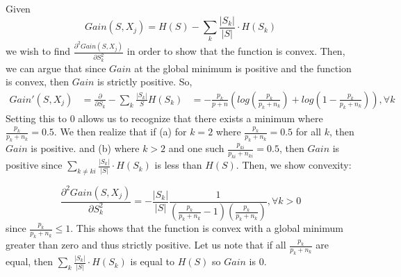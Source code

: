 \documentclass{article}
\begin{document}
Given
\begin{equation*}
Gain(S,X_{j}) = H(S)-\sum_{k}\frac{|S_{k}|}{|S|}\cdot H(S_k)
\end{equation*}
we wish to find \(\frac{\partial^2 Gain(S,X_j)}{\partial S_k^2}\) in order to show that the function is convex. Then, we can argue that since \(Gain\) at the global minimum is positive and the function is convex, then \(Gain\) is strictly positive. So, 
\begin{align*}
Gain'(S,X_j)
&= \frac{\partial}{\partial S_k} -\sum_k \frac{|S_k|}{S} H(S_k)
&= -\frac{p_k}{p+n}(log(\frac{p_k}{p_k+n_k}) + log(1-\frac{p_k}{p_k+n_k})), \forall k
\end{align*}
Setting this to 0 allows us to recognize that there exists a minimum where \(\frac{p_k}{p_k+n_k} = 0.5\). We then realize that if (a) for \(k = 2\) where \(\frac{p_k}{p_k+n_k} = 0.5\) for all \(k\), then \(Gain\) is positive. and (b) where \(k > 2\) and one such \(\frac{p_{ki}}{p_{ki}+n_{ki}} = 0.5\), then \(Gain\) is positive since \(\sum_{k \neq ki}\frac{|S_{k}|}{|S|}\cdot H(S_k)\) is less than \(H(S)\). Then, we show convexity:

\begin{equation*}
\frac{\partial^2 Gain(S,X_j)}{\partial S_k^2} 
= -\frac{|S_k|}{|S|} \frac{1}{(\frac{p_k}{p_k+n_k}-1)(\frac{p_k}{p_k+n_k})}, \forall k
> 0
\end{equation*}
since \(\frac{p_k}{p_k+n_k} \leq 1 \). This shows that the function is convex with a global minimum greater than zero and thus strictly positive. Let us note that if all \(\frac{p_k}{p_k+n_k}\) are equal, then \(\sum_{k}\frac{|S_{k}|}{|S|}\cdot H(S_k)\) is equal to \(H(S)\) so \(Gain\) is 0.
\end{document}
